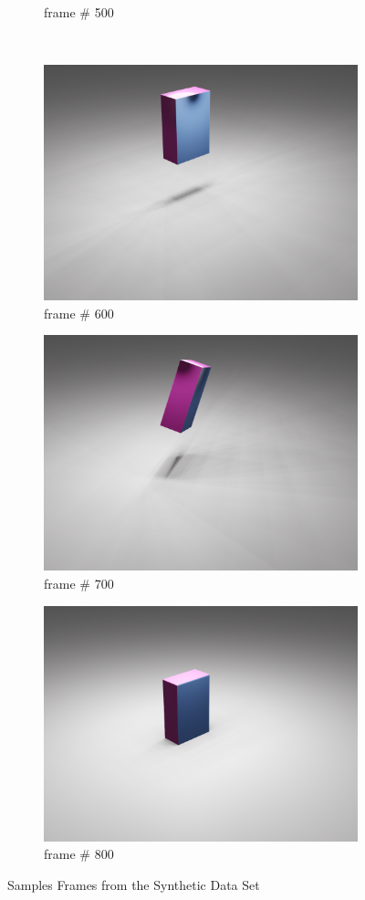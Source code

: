 \begin{figure}[ht]
\begin{subfigure}{.31\textwidth}
  \caption{frame \# 500}
\end{subfigure} 
\\
\begin{subfigure}{.31\textwidth}
  \centering
  \includegraphics[width=.8\linewidth]{0600.png}  
  \caption{frame \# 600}
\end{subfigure}
\hfill
\begin{subfigure}{.31\textwidth}
  \centering
  \includegraphics[width=.8\linewidth]{0700.png}  
  \caption{frame \# 700}
\end{subfigure}
\hfill
\begin{subfigure}{.31\textwidth}
  \centering
  \includegraphics[width=.8\linewidth]{0800.png}  
  \caption{frame \# 800}
\end{subfigure} 
\caption{Samples Frames from the Synthetic Data Set}
\end{figure}